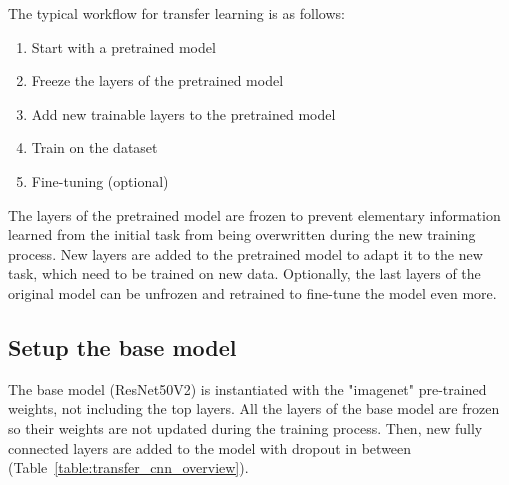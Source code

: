 \documentclass[conference]{IEEEtran}
\begin{document}
The typical workflow for transfer learning is as follows:
\begin{enumerate}
	\item Start with a pretrained model
	\item Freeze the layers of the pretrained model
	\item Add new trainable layers to the pretrained model
	\item Train on the dataset
	\item Fine-tuning (optional)
\end{enumerate}

The layers of the pretrained model are frozen to prevent elementary information learned from the initial task from being overwritten during the new training process. New layers are added to the pretrained model to adapt it to the new task, which need to be trained on new data. Optionally, the last layers of the original model can be unfrozen and retrained to fine-tune the model even more.

\subsection{Setup the base model}
The base model (ResNet50V2) is instantiated with the "imagenet" pre-trained weights, not including the top layers. All the layers of the base model are frozen so their weights are not updated during the training process. Then, new fully connected layers are added to the model with dropout in between (Table~\ref{table:transfer_cnn_overview}).
\end{document}
